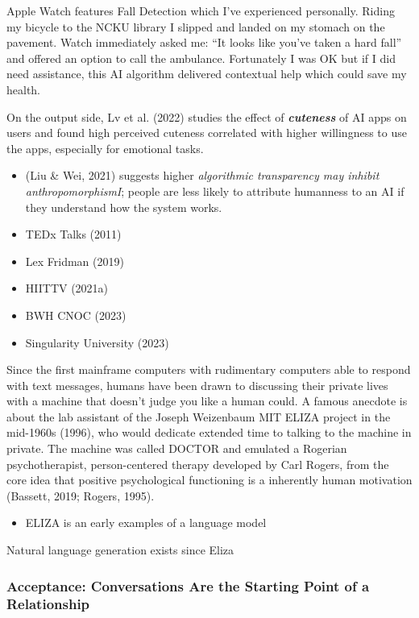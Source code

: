 \documentclass[
  letterpaper,
  DIV=11,
  numbers=noendperiod]{scrartcl}
\providecommand{\tightlist}{%
  \setlength{\itemsep}{0pt}\setlength{\parskip}{0pt}}\usepackage{longtable,booktabs,array}
\begin{document}
Apple Watch features Fall Detection which I've experienced personally.
Riding my bicycle to the NCKU library I slipped and landed on my stomach
on the pavement. Watch immediately asked me: ``It looks like you've
taken a hard fall'' and offered an option to call the ambulance.
Fortunately I was OK but if I did need assistance, this AI algorithm
delivered contextual help which could save my health.

On the output side, Lv et al. (2022) studies the effect of
\textbf{\emph{cuteness}} of AI apps on users and found high perceived
cuteness correlated with higher willingness to use the apps, especially
for emotional tasks.

\begin{itemize}
\tightlist
\item
  (Liu \& Wei, 2021) suggests higher \emph{algorithmic transparency may
  inhibit anthropomorphismI}; people are less likely to attribute
  humanness to an AI if they understand how the system works.
\item
  TEDx Talks (2011)
\item
  Lex Fridman (2019)
\item
  HIITTV (2021a)
\item
  BWH CNOC (2023)
\item
  Singularity University (2023)
\end{itemize}

Since the first mainframe computers with rudimentary computers able to
respond with text messages, humans have been drawn to discussing their
private lives with a machine that doesn't judge you like a human could.
A famous anecdote is about the lab assistant of the Joseph Weizenbaum
MIT ELIZA project in the mid-1960s (1996), who would dedicate extended
time to talking to the machine in private. The machine was called DOCTOR
and emulated a Rogerian psychotherapist, person-centered therapy
developed by Carl Rogers, from the core idea that positive psychological
functioning is a inherently human motivation (Bassett, 2019; Rogers,
1995).

\begin{itemize}
\tightlist
\item
  ELIZA is an early examples of a language model
\end{itemize}

Natural language generation exists since Eliza

\subsubsection{Acceptance: Conversations Are the Starting Point of a
Relationship}\label{acceptance-conversations-are-the-starting-point-of-a-relationship}
\end{document}
